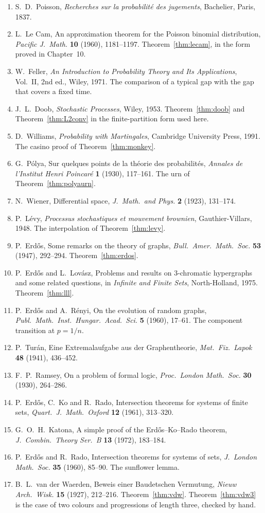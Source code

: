 \begin{enumerate}
\item S.~D.~Poisson, \emph{Recherches sur la probabilit\'e des jugements}, Bachelier, Paris, 1837.
\item L.~Le Cam, An approximation theorem for the Poisson binomial distribution, \emph{Pacific J.\ Math.} \textbf{10} (1960), 1181--1197. Theorem~\ref{thm:lecam}, in the form proved in Chapter~10.
\item W.~Feller, \emph{An Introduction to Probability Theory and Its Applications}, Vol.~II, 2nd ed., Wiley, 1971. The comparison of a typical gap with the gap that covers a fixed time.
\item J.~L.~Doob, \emph{Stochastic Processes}, Wiley, 1953. Theorem~\ref{thm:doob} and Theorem~\ref{thm:L2conv} in the finite-partition form used here.
\item D.~Williams, \emph{Probability with Martingales}, Cambridge University Press, 1991. The casino proof of Theorem~\ref{thm:monkey}.
\item G.~P\'olya, Sur quelques points de la th\'eorie des probabilit\'es, \emph{Annales de l'Institut Henri Poincar\'e} \textbf{1} (1930), 117--161. The urn of Theorem~\ref{thm:polyaurn}.
\item N.~Wiener, Differential space, \emph{J.\ Math.\ and Phys.} \textbf{2} (1923), 131--174.
\item P.~L\'evy, \emph{Processus stochastiques et mouvement brownien}, Gauthier-Villars, 1948. The interpolation of Theorem~\ref{thm:levy}.
\item P.~Erd\H os, Some remarks on the theory of graphs, \emph{Bull.\ Amer.\ Math.\ Soc.} \textbf{53} (1947), 292--294. Theorem~\ref{thm:erdos}.
\item P.~Erd\H os and L.~Lov\'asz, Problems and results on $3$-chromatic hypergraphs and some related questions, in \emph{Infinite and Finite Sets}, North-Holland, 1975. Theorem~\ref{thm:lll}.
\item P.~Erd\H os and A.~R\'enyi, On the evolution of random graphs, \emph{Publ.\ Math.\ Inst.\ Hungar.\ Acad.\ Sci.} \textbf{5} (1960), 17--61. The component transition at $p=1/n$.
\item P.~Tur\'an, Eine Extremalaufgabe aus der Graphentheorie, \emph{Mat.\ Fiz.\ Lapok} \textbf{48} (1941), 436--452.
\item F.~P.~Ramsey, On a problem of formal logic, \emph{Proc.\ London Math.\ Soc.} \textbf{30} (1930), 264--286.
\item P.~Erd\H os, C.~Ko and R.~Rado, Intersection theorems for systems of finite sets, \emph{Quart.\ J.\ Math.\ Oxford} \textbf{12} (1961), 313--320.
\item G.~O.~H.~Katona, A simple proof of the Erd\H os--Ko--Rado theorem, \emph{J.\ Combin.\ Theory Ser.\ B} \textbf{13} (1972), 183--184.
\item P.~Erd\H os and R.~Rado, Intersection theorems for systems of sets, \emph{J.\ London Math.\ Soc.} \textbf{35} (1960), 85--90. The sunflower lemma.
\item B.~L.~van der Waerden, Beweis einer Baudetschen Vermutung, \emph{Nieuw Arch.\ Wisk.} \textbf{15} (1927), 212--216. Theorem~\ref{thm:vdw}. Theorem~\ref{thm:vdw3} is the case of two colours and progressions of length three, checked by hand.
\end{enumerate}
